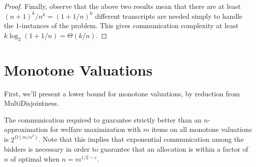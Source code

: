 \begin{proof}
      Finally, observe that the above two results mean that there are at least
      $(n+1)^k/n^k = (1 + 1/n)^k$ different transcripts are needed simply to handle the
      $1$-instances of the problem.
      This gives communication complexity at least
      $k\log_2(1+1/n) = \Theta(k/n)$.
    \end{proof}

\section{Monotone Valuations} 
  First, we'll present a lower bound for monotone
  valuations, by reduction from MultiDisjointness.

  \begin{theorem}
    The communication required to guarantee strictly
    better than an $n$-approximation for welfare maximization with $m$ items on all
    monotone valuations is $2^{\Omega(m/n^2)}$. Note that this implies that
    exponential communication among the bidders is necessary in order to guarantee
    that an allocation is within a factor of $n$ of optimal when $n =
    m^{1/2-\varepsilon}$.
  \end{theorem}
